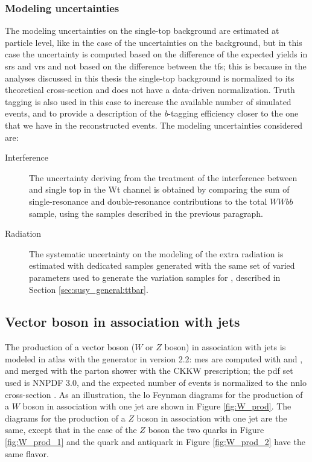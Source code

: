 \subsubsection*{Modeling uncertainties}

The modeling uncertainties on the single-top background are estimated at particle level, 
like in the case of the uncertainties on the \ttbar background, but in this case the uncertainty is computed based on the difference of the expected yields in \glspl{sr} and \glspl{vr} and not based on the difference between the \glspl{tf}; 
this is because in the analyses discussed in this thesis the single-top background is normalized to its theoretical cross-section and does not have a data-driven normalization. Truth tagging is also used in this case to 
increase the available number of simulated events,  
and to provide a description of the \textit{b}-tagging efficiency closer to the one that we have in the reconstructed events. The modeling uncertainties considered are: 

\begin{description}
\item[Interference] The uncertainty deriving from the treatment of the interference between \ttbar and single top in the Wt channel is obtained by  comparing the sum of single-resonance and double-resonance contributions to the total $WWbb$ sample, using the samples described in the previous paragraph.

\item[Radiation] The systematic uncertainty on the modeling of the extra radiation is estimated with dedicated samples generated with the same set of varied parameters used to generate the variation samples for \ttbar, described in Section \ref{sec:susy_general:ttbar}. 

\end{description}

\subsection{Vector boson in association with jets}

The production of a vector boson ($W$ or $Z$ boson) in association with jets is modeled in \gls{atlas} with the \Sherpa generator in version 2.2: \glspl{me} are 
computed with \comix \cite{Gleisberg:2008fv} and \OL \cite{Cascioli:2011va}, and merged with the \Sherpa parton shower with the CKKW prescription; the \gls{pdf} set used is NNPDF 3.0, and the expected number of events is normalized to the \gls{nnlo} cross-section \cite{Catani:2009sm}.
As an illustration, the \gls{lo} Feynman diagrams for the production of a $W$ boson in association with one jet are shown in Figure \ref{fig:W_prod}. 
The diagrams for the production of a $Z$ boson in association with one jet are the same, except that in the case of the $Z$ boson the 
two quarks in Figure \ref{fig:W_prod_1} and the quark and antiquark in Figure \ref{fig:W_prod_2} have the same flavor. 

